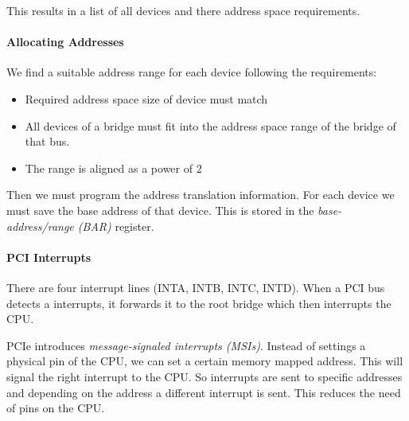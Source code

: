 This results in a list of all devices and there address space requirements.

\paragraph{Allocating Addresses}
We find a suitable address range for each device following the requirements:
\begin{itemize}
    \item Required address space size of device must match
    \item All devices of a bridge must fit into the address space range of the bridge of that bus.
    \item The range is aligned as a power of $2$
\end{itemize}

Then we must program the address translation information. For each device we must save the base address of that device. This is stored in the \textit{base-address/range (BAR)} register.

\paragraph{PCI Interrupts}
There are four interrupt lines (INTA, INTB, INTC, INTD). When a PCI bus detects a interrupts, it forwards it to the root bridge which then interrupts the CPU. 

PCIe introduces \textit{message-signaled interrupts (MSIs)}. Instead of settings a physical pin of the CPU, we can set a certain memory mapped address. This will signal the right interrupt to the CPU. So interrupts are sent to specific addresses and depending on the address a different interrupt is sent. This reduces the need of pins on the CPU.
